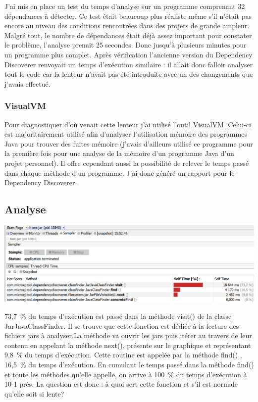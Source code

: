 \documentclass[french,a4paper,12pt]{report}
\begin{document}
J’ai mis en place un test du temps d’analyse sur un programme comprenant 32 dépendances à détecter. Ce test était beaucoup plus réaliste même s'il n'était pas encore au niveau des conditions rencontrées dans des projets de grande ampleur. Malgré tout, le nombre de dépendances était déjà assez important pour constater le problème, l’analyse prenait 25 secondes. Donc jusqu’à plusieurs minutes pour un programme plus complet. Après vérification l’ancienne version du Dependency Discoverer renvoyait un temps d’exécution similaire : il allait donc falloir analyser tout le code car la lenteur n'avait pas été introduite avec un des changements que j'avais effectué.

\subsubsection{VisualVM}

Pour diagnostiquer d’où venait cette lenteur j’ai utilisé l’outil \href{https://visualvm.github.io/}{VisualVM} .Celui-ci est majoritairement utilisé afin d’analyser l’utilisation mémoire des programmes Java pour trouver des fuites mémoire (j’avais d’ailleurs utilisé ce programme pour la première fois pour une analyse de la mémoire d’un programme Java d'un projet personnel). Il offre cependant aussi la possibilité de relever le temps passé dans chaque méthode d’un programme. J’ai donc généré un rapport pour le Dependency Discoverer.

\subsection{Analyse}

\begin{center}
\includegraphics[width=\textwidth]{./ressources/images/timeRepartitionByMethodssheer.png}
\end{center}

73,7 \% du temps d’exécution est passé dans la méthode visit() de la classe JarJavaClassFinder. Il se trouve que cette fonction est dédiée à la lecture des fichiers jars à analyser.La méthode va ouvrir les jars puis itérer au travers de leur contenu en appelant la méthode next(), présente sur le graphique et représentant 9,8 \% du temps d’exécution. Cette routine est appelée par la méthode find() , 16,5 \% du temps d’exécution. En cumulant le temps passé dans la méthode find() et toute les méthodes qu'elle appelle, on arrive à 100 \% du temps d’exécution à 10-1 près. La question est donc : à quoi sert cette fonction et s'il est normale qu’elle soit si lente?
\end{document}
